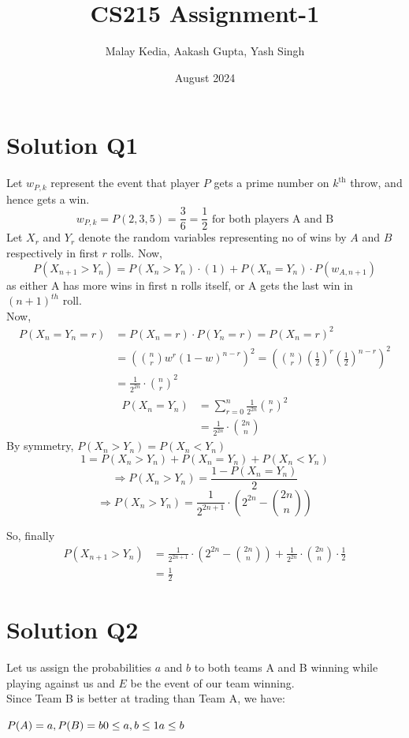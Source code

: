 \documentclass[fleqn]{article}
\title{CS215 Assignment-1}
\author{Malay Kedia, Aakash Gupta, Yash Singh}
\date{August 2024}
\begin{document}
\maketitle

\section{Solution Q1}

Let $w_{P, k}$ represent the event that player $P$ gets a prime number on $k^{\text {th}}$ throw, and hence gets a win.
\[
w_{P, k} = P(2,3,5)=\frac{3}{6}=\frac{1}{2} \text{ for both players A and B}
\]
Let $X_r$ and $Y_r$ denote the random variables representing no of wins by $A$ and $B$ respectively in first $r$ rolls.  Now,
\[
P(X_{n+1}>Y_n)=P(X_n>Y_n)\cdot(1)+P(X_n=Y_n) \cdot P(w_{A, n+1})
\]
as either A has more wins in first n rolls itself, or A gets the last win in $(n+1)^{th}$ roll.\\
Now,
\begin{align*}
P(X_n = Y_n = r) &= P(X_n = r) \cdot P(Y_n = r) = P(X_n = r)^2 \\
&= \left(\binom{n}{r} w^r (1-w)^{n-r}\right)^2 = \left(\binom{n}{r} \left(\frac{1}{2}\right)^r \left(\frac{1}{2}\right)^{n-r}\right)^2 \\
&= \frac{1}{2^{2n}}\cdot \binom{n}{r}^2
\end{align*}
\begin{align*}
P(X_n = Y_n) &= \sum_{r=0}^n \frac{1}{2^{2n}} \binom{n}{r}^2 \\
&= \frac{1}{2^{2n}}\cdot \binom{2n}{n}
\end{align*}
By symmetry, $P(X_n>Y_n)=P(X_n<Y_n)$
\[
1=P\left(X_n>Y_n\right)+P\left(X_n=Y_n\right)+P\left(X_n<Y_n\right) 
\]
\[
\Rightarrow P\left(X_n>Y_n\right)=\frac{1-P\left(X_n=Y_n\right)}{2}
\]
\[
\Rightarrow P\left(X_n > Y_n\right) = \frac{1}{2^{2n+1}} \cdot \left(2^{2n} - \binom{2n}{n}\right)
\]

So, finally
\begin{align*}
P(X_{n+1}>Y_n)&=\frac{1}{2^{2n+1}} \cdot \left(2^{2n} - \binom{2n}{n}\right)+\frac{1}{2^{2n}}\cdot \binom{2n}{n} \cdot \frac{1}{2}\\
& =\frac{1}{2}
\end{align*}

\newpage
\section{Solution Q2}
Let us assign the probabilities $a$ and $b$ to both teams A and B winning while playing against us and $E$ be the event of our team winning.
\\ Since Team B is better at trading than Team A, we have:
\\
\begin{center}
    \begin{math}
        P(A) = a , 
        P(B) = b
        \\0 \leq a,b \leq 1
        \\a \leq b
    \end{math}
\end{center}
\end{document}
